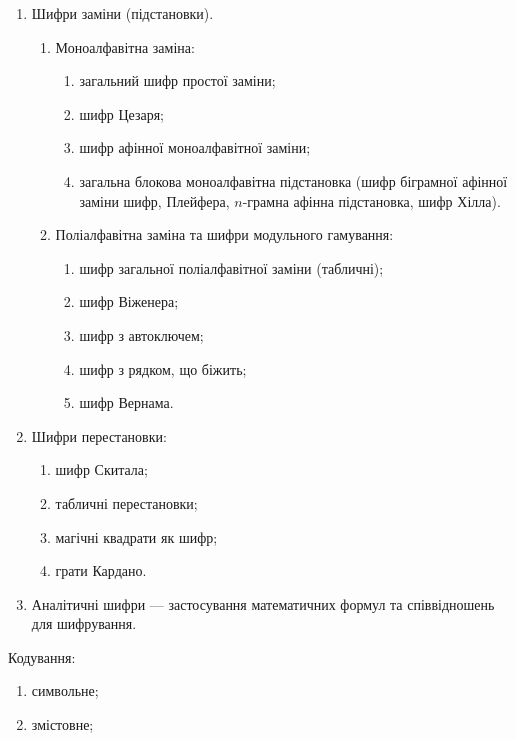 \begin{enumerate}
    \item Шифри заміни (підстановки).
    \begin{enumerate}
        \item Моноалфавітна заміна:
        \begin{enumerate}
            \item загальний шифр простої заміни;
            \item шифр Цезаря;
            \item шифр афінної моноалфавітної заміни;
            \item загальна блокова моноалфавітна підстановка (шифр біграмної
            афінної заміни шифр, Плейфера, $n$-грамна афінна підстановка, шифр
            Хілла).
        \end{enumerate}
        \item Поліалфавітна заміна та шифри модульного гамування:
        \begin{enumerate}
            \item шифр загальної поліалфавітної заміни (табличні);
            \item шифр Віженера;
            \item шифр з автоключем;
            \item шифр з рядком, що біжить;
            \item шифр Вернама.
        \end{enumerate}
    \end{enumerate}
    
    \item Шифри перестановки:
    \begin{enumerate}
        \item шифр Скитала;
        \item табличні перестановки;
        \item магічні квадрати як шифр;
        \item грати Кардано.
    \end{enumerate}
    
    \item Аналітичні шифри --- застосування математичних формул та
    співвідношень для шифрування.
\end{enumerate}

Кодування:
\begin{enumerate}
    \item символьне;
    \item змістовне;
\end{enumerate}

